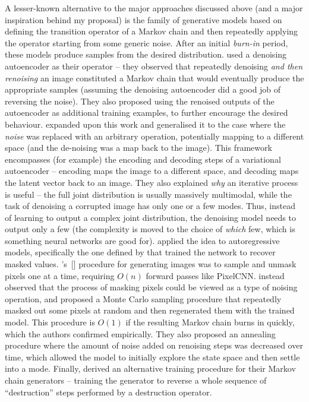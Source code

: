 \documentclass[11pt, a4paper, openany]{book}
\newcommand{\nquote}[1]{``{#1}''}
\newcommand\cites[1]{\citeauthor{#1}'s\ [\citeyear{#1}]}
\begin{document}
A lesser-known alternative to the major approaches discussed above (and a major inspiration behind my proposal) is the family of generative models based on defining the transition operator of a Markov chain and then repeatedly applying the operator starting from some generic noise. After an initial \emph{burn-in} period, these models produce samples from the desired distribution. \citet{denoisinggenerative} used a denoising autoencoder as their operator -- they observed that repeatedly denoising \emph{and then renoising} an image constituted a Markov chain that would eventually produce the appropriate samples (assuming the denoising autoencoder did a good job of reversing the noise). They also proposed using the renoised outputs of the autoencoder as additional training examples, to further encourage the desired behaviour. \citet{gsn} expanded upon this work and generalised it to the case where the \emph{noise} was replaced with an arbitrary operation, potentially mapping to a different space (and the de-noising was a map back to the image). This framework encompasses (for example) the encoding and decoding steps of a variational autoencoder -- encoding maps the image to a different space, and decoding maps the latent vector back to an image. They also explained \emph{why} an iterative process is useful -- the full joint distribution is usually massively multimodal, while the task of denoising a corrupted image has only one or a few modes. Thus, instead of learning to output a complex joint distribution, the denoising model needs to output only a few (the complexity is moved to the choice of \emph{which} few, which is something neural networks are good for). \citet{gsnnade} applied the idea to autoregressive models, specifically the one defined by \citet{dnade} that trained the network to recover masked values. \cites{dnade} procedure for generating images was to sample and unmask pixels one at a time, requiring $O(n)$ forward passes like PixelCNN. \citet{gsnnade} instead observed that the process of masking pixels could be viewed as a type of noising operation, and proposed a Monte Carlo sampling procedure that repeatedly masked out some pixels at random and then regenerated them with the trained model. This procedure is $O(1)$ if the resulting Markov chain burns in quickly, which the authors confirmed empirically. They also proposed an annealing procedure where the amount of noise added on renoising steps was decreased over time, which allowed the model to initially explore the state space and then settle into a mode. Finally, \citet{transitionstochastic} derived an alternative training procedure for their Markov chain generators -- training the generator to reverse a whole sequence of \nquote{destruction} steps performed by a destruction operator.
\end{document}
